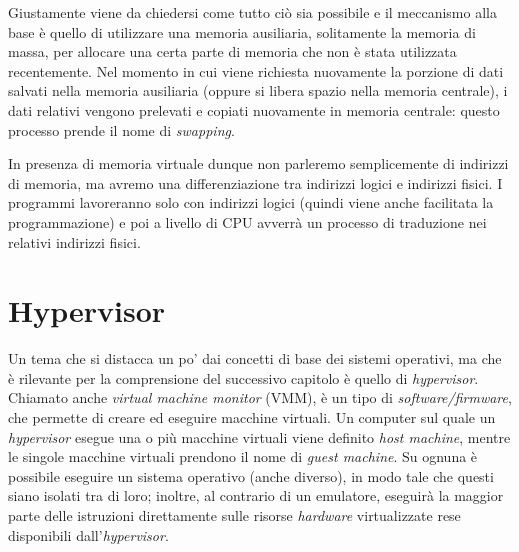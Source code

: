 Giustamente viene da chiedersi come tutto ciò sia possibile e il meccanismo alla base è quello di utilizzare una memoria ausiliaria, solitamente la memoria di massa, per allocare una certa parte di memoria che non è stata utilizzata recentemente. Nel momento in cui viene richiesta nuovamente la porzione di dati salvati nella memoria ausiliaria (oppure si libera spazio nella memoria centrale), i dati relativi vengono prelevati e copiati nuovamente in memoria centrale: questo processo prende il nome di \textit{swapping}. 

In presenza di memoria virtuale dunque non parleremo semplicemente di indirizzi di memoria, ma avremo una differenziazione tra indirizzi logici e indirizzi fisici. I programmi lavoreranno solo con indirizzi logici (quindi viene anche facilitata la programmazione) e poi a livello di CPU avverrà un processo di traduzione nei relativi indirizzi fisici.

\section{Hypervisor}
Un tema che si distacca un po' dai concetti di base dei sistemi operativi, ma che è rilevante per la comprensione del successivo capitolo è quello di \textit{hypervisor}. Chiamato anche \textit{virtual machine monitor} (VMM), è un tipo di \textit{software/firmware}, che permette di creare ed eseguire macchine virtuali. Un computer sul quale un \textit{hypervisor} esegue una o più macchine virtuali viene definito \textit{host machine}, mentre le singole macchine virtuali prendono il nome di \textit{guest machine}. Su ognuna è possibile eseguire un sistema operativo (anche diverso), in modo tale che questi siano isolati tra di loro; inoltre, al contrario di un emulatore, eseguirà la maggior parte delle istruzioni direttamente sulle risorse \textit{hardware} virtualizzate rese disponibili dall'\textit{hypervisor}.